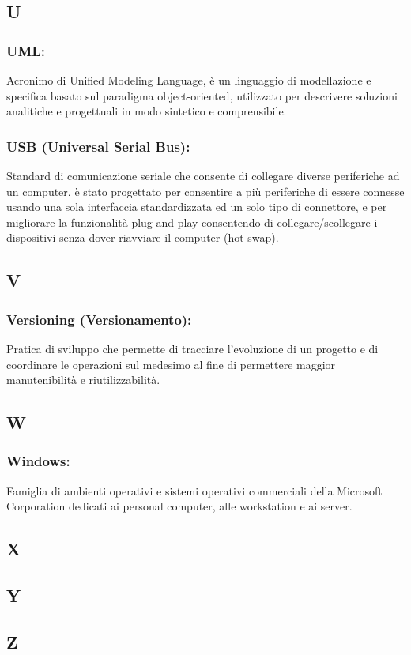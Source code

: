 \subsection*{\huge{U}}
\subsubsection*{UML:} Acronimo di Unified Modeling Language, \`e un linguaggio
di modellazione e specifica basato sul paradigma object-oriented, utilizzato per
descrivere soluzioni analitiche e progettuali in modo sintetico e comprensibile.

\subsubsection*{USB (Universal Serial Bus):} Standard di comunicazione seriale
che consente di collegare diverse periferiche ad un computer. \`e stato progettato
per consentire a pi\`u periferiche di essere connesse usando una sola interfaccia
standardizzata ed un solo tipo di connettore, e per migliorare la funzionalit\`a
plug-and-play consentendo di collegare/scollegare i dispositivi senza dover
riavviare il computer (hot swap).

\subsection*{\huge{V}} 
\subsubsection*{Versioning (Versionamento):} Pratica di sviluppo che permette di
tracciare l'evoluzione di un progetto e di coordinare le operazioni sul medesimo
al fine di permettere maggior manutenibilit\`a e riutilizzabilit\`a.

\subsection*{\huge{W}}
\subsubsection*{Windows:} Famiglia di ambienti operativi e sistemi operativi
commerciali della Microsoft Corporation dedicati ai personal computer, alle workstation e ai server.

\subsection*{\huge{X}}
\subsection*{\huge{Y}}
\subsection*{\huge{Z}}






